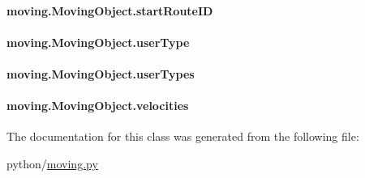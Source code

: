 \hypertarget{classmoving_1_1MovingObject_a23e2a42b45ab136da5b02e9c8341fea1}{
\paragraph[{start\-Route\-I\-D}]{\setlength{\rightskip}{0pt plus 5cm}moving.\-Moving\-Object.\-start\-Route\-I\-D}}\label{classmoving_1_1MovingObject_a23e2a42b45ab136da5b02e9c8341fea1}
\hypertarget{classmoving_1_1MovingObject_a4f078339d8175f616b3f167c6abf4d2d}{
\paragraph[{user\-Type}]{\setlength{\rightskip}{0pt plus 5cm}moving.\-Moving\-Object.\-user\-Type}}\label{classmoving_1_1MovingObject_a4f078339d8175f616b3f167c6abf4d2d}
\hypertarget{classmoving_1_1MovingObject_a25b52c7d2f777b62e565aed35a022e5c}{
\paragraph[{user\-Types}]{\setlength{\rightskip}{0pt plus 5cm}moving.\-Moving\-Object.\-user\-Types}}\label{classmoving_1_1MovingObject_a25b52c7d2f777b62e565aed35a022e5c}
\hypertarget{classmoving_1_1MovingObject_a705c214e02c9b4dab93d387044437923}{
\paragraph[{velocities}]{\setlength{\rightskip}{0pt plus 5cm}moving.\-Moving\-Object.\-velocities}}\label{classmoving_1_1MovingObject_a705c214e02c9b4dab93d387044437923}


The documentation for this class was generated from the following file\-:\begin{DoxyCompactItemize}
\item 
python/\hyperlink{moving_8py}{moving.\-py}\end{DoxyCompactItemize}
